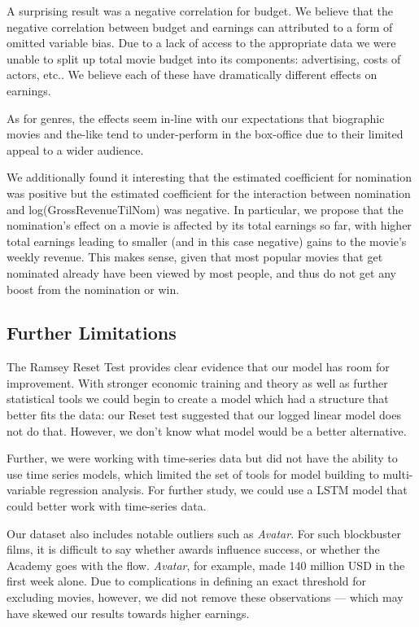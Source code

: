 \documentclass[10.7pt]{article} %
\begin{document}
A surprising result was a negative correlation for budget. We believe that the negative correlation between budget and earnings can attributed to a form of omitted variable bias. Due to a lack of access to the appropriate data we were unable to split up total movie budget into its components: advertising, costs of actors, etc.. We believe each of these have dramatically different effects on earnings.

As for genres, the effects seem in-line with our expectations that biographic movies and the-like tend to under-perform in the box-office due to their limited appeal to a wider audience.

We additionally found it interesting that the estimated coefficient for nomination was positive but the estimated coefficient for the interaction between nomination and log(GrossRevenueTilNom) was negative. In particular, we propose that the nomination's effect on a movie is affected by its total earnings so far, with higher total earnings leading to smaller (and in this case negative) gains to the movie's weekly revenue. This makes sense, given that most popular movies that get nominated already have been viewed by most people, and thus do not get any boost from the nomination or win.


\subsection{Further Limitations}

The Ramsey Reset Test provides clear evidence that our model has room for improvement. With stronger economic training and theory as well as further statistical tools we could begin to create a model which had a structure that better fits the data: our Reset test suggested that our logged linear model does not do that. However, we don't know what model would be a better alternative. 

Further, we were working with time-series data but did not have the ability to use time series models, which limited the set of tools for model building to multi-variable regression analysis. For further study, we could use a LSTM model that could better work with time-series data. 


Our dataset also includes notable outliers such as \textit{Avatar}. For such blockbuster films, it is difficult to say whether awards influence success, or whether the Academy goes with the flow. \textit{Avatar}, for example, made 140 million USD in the first week alone. Due to complications in defining an exact threshold for excluding movies, however, we did not remove these observations — which may have skewed our results towards higher earnings. 
\end{document}
